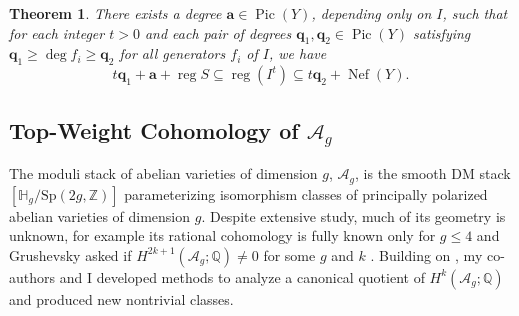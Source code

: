 \documentclass[11pt,reqno]{amsart}
\newtheorem{theorem}[lemma]{Theorem}
\theoremstyle{remark}
\newcommand{\reg}{\operatorname{reg}}
\newcommand{\Pic}{\operatorname{Pic}}
\newcommand{\Nef}{\operatorname{Nef}}
\renewcommand{\aa}{\mathbf{a}}
\newcommand{\qq}{\mathbf{q}}
\newcommand{\PP}{\mathbb{P}}
\newcommand{\QQ}{\mathbb{Q}}
\newcommand{\ZZ}{\mathbb{Z}}
\newcommand{\cA}{\mathcal{A}}
\begin{document}
\begin{theorem}\cite[Theorem 4.1]{bruceHellerSayrafi22}
  There exists a degree $\aa\in\Pic(Y)$, depending only on $I$, such that for each integer $t>0$ and each pair of degrees $\qq_1,\qq_2\in\Pic(Y)$ satisfying $\qq_1\geq\deg f_i\geq\qq_2$ for all generators $f_i$ of $I$, we have
	\[ t\qq_1+\aa+\reg S \subseteq \reg\!\left(I^t\right) \subseteq t\qq_2+\Nef(Y). \]
\end{theorem}

%
%

\subsection{Top-Weight Cohomology of $\mathcal{A}_{g}$}\label{subsec:prior:cohomology-of-ag}

The moduli stack of abelian varieties of dimension $g$, $\cA_g$, is the smooth DM stack $[\mathbb{H}_g/\mathrm{Sp}(2g, \ZZ)]$ parameterizing isomorphism classes of principally polarized abelian varieties of dimension $g$. Despite extensive study, much of its geometry is unknown, for example its rational cohomology is fully known only for $g\leq 4$ \cite{igusa62,hain02,HT12,HT18} and Grushevsky asked if $H^{2k+1}(\cA_{g};\QQ)\neq0$ for some $g$ and $k$ \cite{grushevsky09}. Building on \cite{CGP21}, my co-authors and I developed methods to analyze a canonical quotient of $H^{k}(\cA_{g}; \QQ)$ and produced new nontrivial classes.
\end{document}

